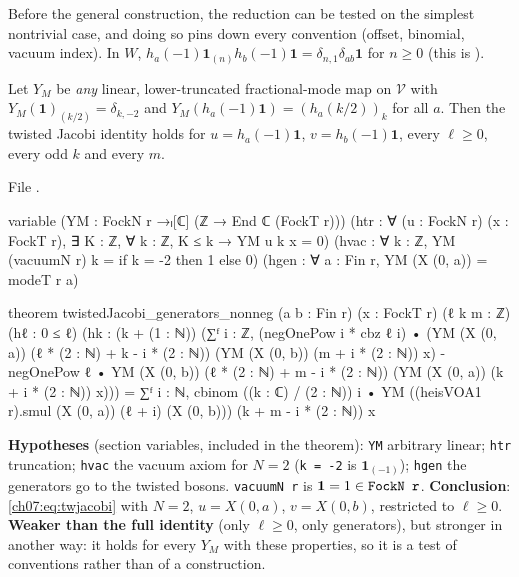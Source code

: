 Before the general construction, the reduction can be tested on the simplest nontrivial case,
and doing so pins down every convention (offset, binomial, vacuum index). In $W$,
$h_a(-1)\mathbf 1_{(n)}h_b(-1)\mathbf 1 = \delta_{n,1}\delta_{ab}\mathbf 1$ for $n\ge0$ (this is
).

\begin{theorem}\label{ch07:thm:gencheck}
Let $Y_M$ be \emph{any} linear, lower-truncated fractional-mode map on $\mathcal V$ with
$Y_M(\mathbf 1)_{(k/2)} = \delta_{k,-2}$ and $Y_M(h_a(-1)\mathbf 1) = (h_a(k/2))_k$ for all $a$.
Then the twisted Jacobi identity holds for $u = h_a(-1)\mathbf 1$, $v = h_b(-1)\mathbf 1$, every
$\ell\ge0$, every odd $k$ and every $m$.
\end{theorem}

\noindent File .
\begin{leancode}
variable (YM : FockN r →ₗ[ℂ] (ℤ → End ℂ (FockT r)))
  (htr : ∀ (u : FockN r) (x : FockT r), ∃ K : ℤ, ∀ k : ℤ, K ≤ k → YM u k x = 0)
  (hvac : ∀ k : ℤ, YM (vacuumN r) k = if k = -2 then 1 else 0)
  (hgen : ∀ a : Fin r, YM (X (0, a)) = modeT r a)

theorem twistedJacobi_generators_nonneg (a b : Fin r) (x : FockT r) (ℓ k m : ℤ) (hℓ : 0 ≤ ℓ)
    (hk : (k + (1 : ℕ)) %
    (∑ᶠ i : ℤ, (negOnePow i * cbz ℓ i) •
        (YM (X (0, a)) (ℓ * (2 : ℕ) + k - i * (2 : ℕ)) (YM (X (0, b)) (m + i * (2 : ℕ)) x)
          - negOnePow ℓ • YM (X (0, b)) (ℓ * (2 : ℕ) + m - i * (2 : ℕ))
              (YM (X (0, a)) (k + i * (2 : ℕ)) x)))
      = ∑ᶠ i : ℕ, cbinom ((k : ℂ) / (2 : ℕ)) i •
          YM ((heisVOA1 r).smul (X (0, a)) (ℓ + i) (X (0, b))) (k + m - i * (2 : ℕ)) x
\end{leancode}

\begin{dictionary}
\textbf{Hypotheses} (section variables, included in the theorem): \verb|YM| arbitrary linear;
\verb|htr| truncation; \verb|hvac| the vacuum axiom for $N=2$ (\verb|k = -2| is $\mathbf
1_{(-1)}$); \verb|hgen| the generators go to the twisted bosons. \verb|vacuumN r| is
$\mathbf1 = 1\in\lean{FockN r}$. \textbf{Conclusion}: \eqref{ch07:eq:twjacobi} with $N=2$,
$u = X(0,a)$, $v = X(0,b)$, restricted to $\ell\ge0$. \textbf{Weaker than the full identity}
(only $\ell\ge0$, only generators), but stronger in another way: it holds for every $Y_M$ with
these properties, so it is a test of conventions rather than of a construction.
\end{dictionary}

